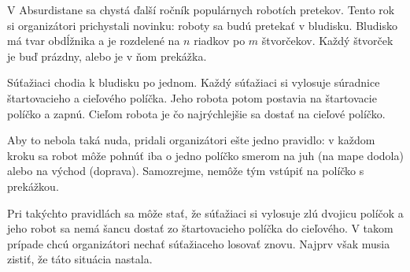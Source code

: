 





V Absurdistane sa chystá ďalší ročník populárnych robotích pretekov. Tento rok
si organizátori prichystali novinku: roboty sa budú pretekať v bludisku. Bludisko
má tvar obdĺžnika a je rozdelené na $n$ riadkov po $m$ štvorčekov.
Každý štvorček je buď prázdny, alebo je v ňom prekážka.


Súťažiaci chodia k bludisku po jednom. Každý súťažiaci si vylosuje súradnice
štartovacieho a cieľového políčka. Jeho robota potom postavia na štartovacie políčko
a zapnú. Cieľom robota je čo najrýchlejšie sa dostať na cieľové políčko.


Aby to nebola taká nuda,
pridali organizátori ešte jedno pravidlo: v každom kroku sa robot môže pohnúť iba o jedno
políčko smerom na juh (na mape dodola) alebo na východ (doprava). Samozrejme, nemôže tým 
vstúpiť na políčko s prekážkou.



Pri takýchto pravidlách sa môže stať, že súťažiaci si vylosuje zlú dvojicu políčok
a jeho robot sa nemá šancu dostať zo štartovacieho políčka do cieľového. V takom prípade
chcú organizátori nechať súťažiaceho losovať znovu. Najprv však musia zistiť, že táto
situácia nastala.

